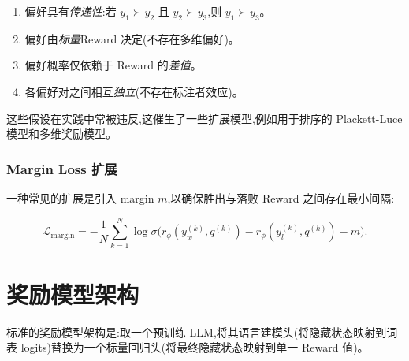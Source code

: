 \begin{keybox}
\begin{enumerate}
  \item 偏好具有\emph{传递性}:若 $y_1 \succ y_2$ 且 $y_2 \succ y_3$,则 $y_1 \succ y_3$。
  \item 偏好由\emph{标量}Reward 决定(不存在多维偏好)。
  \item 偏好概率仅依赖于 Reward 的\emph{差值}。
  \item 各偏好对之间相互\emph{独立}(不存在标注者效应)。
\end{enumerate}

这些假设在实践中常被违反,这催生了一些扩展模型,例如用于排序的 Plackett-Luce 模型和多维奖励模型。
\end{keybox}

\subsubsection*{Margin Loss 扩展}
\label{margin-loss-extension}

一种常见的扩展是引入 margin $m$,以确保胜出与落败 Reward 之间存在最小间隔:

\[
\mathcal{L}_{\text{margin}} =
    -\frac{1}{N}\sum_{k=1}^N \log \sigma\!\bigl(r_\phi(y_w^{(k)}, q^{(k)}) - r_\phi(y_l^{(k)}, q^{(k)}) - m\bigr).
\]

\section{奖励模型架构}
\label{sec:rm-architectures}

\begin{intuitionbox}[LLM 上的分类头]
标准的奖励模型架构是:取一个预训练 LLM,将其语言建模头(将隐藏状态映射到词表 logits)替换为一个标量回归头(将最终隐藏状态映射到单一 Reward 值)。
\end{intuitionbox}

